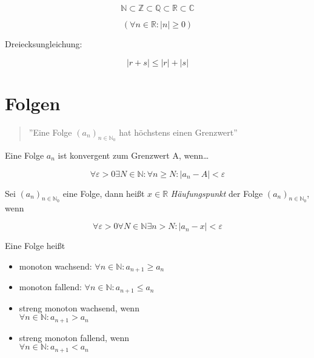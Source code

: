 \documentclass[11pt,a4paper,twocolumn]{article}
\theoremstyle{area}
\renewcommand{\epsilon}{\varepsilon}
\begin{document}
\begin{equation}
    \mathbb{N} \subset \mathbb{Z} \subset \mathbb{Q}
        \subset \mathbb{R} \subset \mathbb{C}
\end{equation}

\begin{equation}
    (\forall n \in \mathbb{R}: | n | \geq 0)
\end{equation}

Dreiecksungleichung:

\begin{equation}
    | r + s | \leq | r | + | s |
\end{equation}

\section{Folgen}

\begin{quote}
    ''Eine Folge $(a_n)_{n\in\mathbb{N}_0}$ hat höchstens einen Grenzwert''
\end{quote}

Eine Folge $a_n$ ist konvergent zum Grenzwert A, wenn\dots

\begin{equation}
    \forall \epsilon > 0 \exists N \in \mathbb{N}:
        \forall n \geq N : |a_n - A| < \epsilon
\end{equation}

Sei $(a_n)_{n\in\mathbb{N}_0}$ eine Folge, dann heißt $x\in\mathbb{R}$
\emph{Häufungspunkt} der Folge $(a_n)_{n\in\mathbb{N}_0}$, wenn

\begin{equation}
    \forall \epsilon > 0 \forall N \in \mathbb{N} \exists n > N:
        | a_n - x | < \epsilon
\end{equation}

Eine Folge heißt
\begin{itemize}
  \item monoton wachsend: $\forall n \in \mathbb{N}: a_{n+1} \geq a_n$
  \item monoton fallend: $\forall n \in \mathbb{N}: a_{n+1} \leq a_n$
  \item streng monoton wachsend, wenn \\ $\forall n \in \mathbb{N}: a_{n+1} > a_n$
  \item streng monoton fallend, wenn \\ $\forall n \in \mathbb{N}: a_{n+1} < a_n$
\end{itemize}
\end{document}
